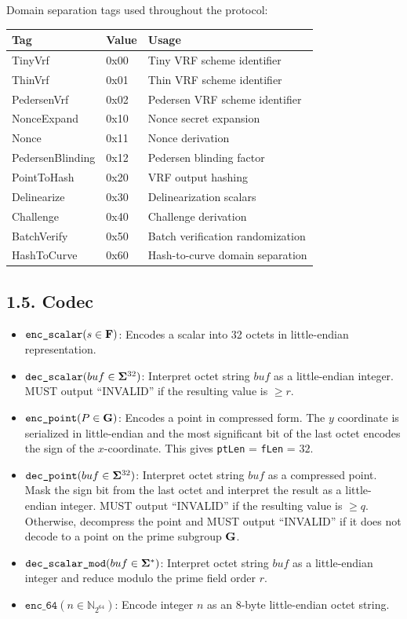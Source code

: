 \documentclass[
]{article}
\providecommand{\tightlist}{%
  \setlength{\itemsep}{0pt}\setlength{\parskip}{0pt}}
\begin{document}
Domain separation tags used throughout the protocol:

\begin{longtable}[]{@{}lll@{}}
\toprule\noalign{}
Tag & Value & Usage \\
\midrule\noalign{}
\endhead
\bottomrule\noalign{}
\endlastfoot
TinyVrf & 0x00 & Tiny VRF scheme identifier \\
ThinVrf & 0x01 & Thin VRF scheme identifier \\
PedersenVrf & 0x02 & Pedersen VRF scheme identifier \\
NonceExpand & 0x10 & Nonce secret expansion \\
Nonce & 0x11 & Nonce derivation \\
PedersenBlinding & 0x12 & Pedersen blinding factor \\
PointToHash & 0x20 & VRF output hashing \\
Delinearize & 0x30 & Delinearization scalars \\
Challenge & 0x40 & Challenge derivation \\
BatchVerify & 0x50 & Batch verification randomization \\
HashToCurve & 0x60 & Hash-to-curve domain separation \\
\end{longtable}

\subsection{1.5. Codec}\label{codec}

\begin{itemize}
\tightlist
\item
  \(\texttt{enc\_scalar}(s \in \bold{F})\): Encodes a scalar into 32
  octets in little-endian representation.
\item
  \(\texttt{dec\_scalar}(buf \in \bold{\Sigma}^{32})\): Interpret octet
  string \(buf\) as a little-endian integer. MUST output ``INVALID'' if
  the resulting value is \(\geq r\).
\item
  \(\texttt{enc\_point}(P \in \bold{G})\): Encodes a point in compressed
  form. The \(y\) coordinate is serialized in little-endian and the most
  significant bit of the last octet encodes the sign of the
  \(x\)-coordinate. This gives \texttt{ptLen} = \texttt{fLen} = \(32\).
\item
  \(\texttt{dec\_point}(buf \in \bold{\Sigma}^{32})\): Interpret octet
  string \(buf\) as a compressed point. Mask the sign bit from the last
  octet and interpret the result as a little-endian integer. MUST output
  ``INVALID'' if the resulting value is \(\geq q\). Otherwise,
  decompress the point and MUST output ``INVALID'' if it does not decode
  to a point on the prime subgroup \(\bold{G}\).
\item
  \(\texttt{dec\_scalar\_mod}(buf \in \bold{\Sigma}^*)\): Interpret
  octet string \(buf\) as a little-endian integer and reduce modulo the
  prime field order \(r\).
\item
  \(\texttt{enc\_64}(n \in \mathbb{N}_{2^{64}})\): Encode integer \(n\)
  as an 8-byte little-endian octet string.
\end{itemize}
\end{document}
